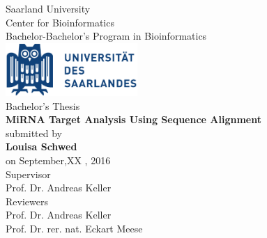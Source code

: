 \documentclass[12pt,  a4paper]{report}
\begin{document}
\def\supervisorIname{Advisor I}
\def\supervisorIIname{Second Reviewer}

	\def\university{Saarland Universitiy}
	\def\institute{Center for Bioinformatics}
	\def\chair{Bachelor's Program in Bioinformatics}
	\def\projectname{MiRNA Target Analysis Using Sequence Alignment}
	\vspace{.2em}  
	\def\author{Louisa Schwed}
	\def\date{September 2016}

\begin{titlepage}

  \begin{minipage}{\textwidth}
    \begin{center}
    { \large Saarland University \\ Center for Bioinformatics\\ Bachelor-Bachelor's Program in Bioinformatics \\}
	\vspace{1.5cm}
    \includegraphics[width=5cm]{Logo-Universitaet_des_Saarlandes.pdf}\\
    \vspace{1.5cm}
    { \large Bachelor's Thesis\\}
    \vspace{0.5cm}
    {\huge\textbf{\projectname}}\\
    \vspace{1.5cm}
    { \large submitted by}\\
	\vspace{0.5cm}
    {\large\textbf{\author}}\\
    \vspace{0.5cm}
    {\large on September,XX , 2016}\\
    \vspace{1.5cm}
    {\large Supervisor}\\
    \vspace{0.5cm}
    {\large Prof. Dr. Andreas Keller}\\
    \vspace{1.5cm}
    {\large Reviewers}\\
    \vspace{0.5cm}
    {\large Prof. Dr. Andreas Keller}\\
   	{\large Prof. Dr. rer. nat. Eckart Meese}\\
    \vspace{0.5cm}
    \end{center}
  \end{minipage}   
   

\end{titlepage}
\end{document}
